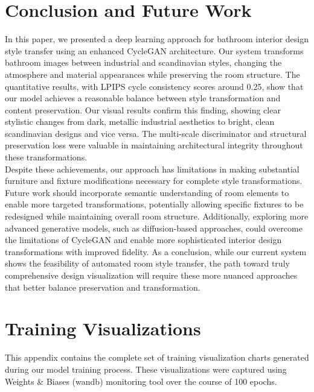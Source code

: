 \documentclass[twocolumn,superscriptaddress,aps]{revtex4-1}
\begin{document}
\section{Conclusion and Future Work}

In this paper, we presented a deep learning approach for bathroom interior design style transfer using an enhanced CycleGAN architecture. Our system transforms bathroom images between industrial and scandinavian styles, changing the atmosphere and material appearances while preserving the room structure. The quantitative results, with LPIPS cycle consistency scores around 0.25, show that our model achieves a reasonable balance between style transformation and content preservation. Our visual results confirm this finding, showing clear stylistic changes from dark, metallic industrial aesthetics to bright, clean scandinavian designs and vice versa. The multi-scale discriminator and structural preservation loss were valuable in maintaining architectural integrity throughout these transformations. \\

Despite these achievements, our approach has limitations in making substantial furniture and fixture modifications necessary for complete style transformations. Future work should incorporate semantic understanding of room elements to enable more targeted transformations, potentially allowing specific fixtures to be redesigned while maintaining overall room structure. Additionally, exploring more advanced generative models, such as diffusion-based approaches, could overcome the limitations of CycleGAN and enable more sophisticated interior design transformations with improved fidelity. As a conclusion, while our current system shows the feasibility of automated room style transfer, the path toward truly comprehensive design visualization will require these more nuanced approaches that better balance preservation and transformation.



\appendix
\section{Training Visualizations}

This appendix contains the complete set of training visualization charts generated during our model training process. These visualizations were captured using Weights \& Biases (wandb) monitoring tool over the course of 100 epochs.
\end{document}
